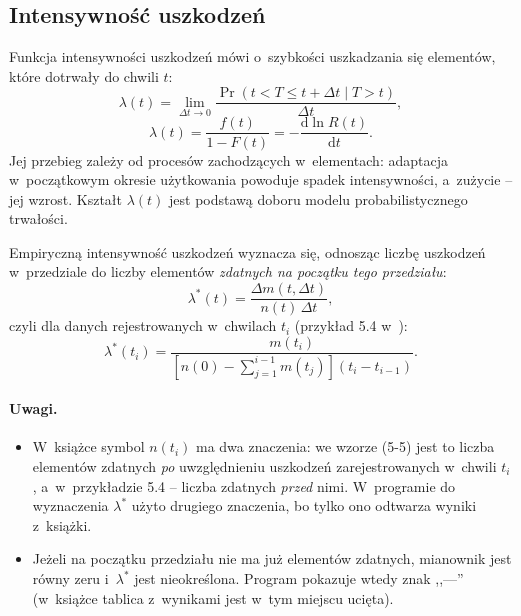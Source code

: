 \subsection{Intensywność uszkodzeń}

Funkcja intensywności uszkodzeń mówi o~szybkości uszkadzania się elementów, które
dotrwały do chwili $t$:
\begin{equation}
  \lambda(t) = \lim_{\Delta t \to 0} \frac{\Pr(t < T \leq t + \Delta t \mid T > t)}{\Delta t}, \tag{5-10}
\end{equation}
\begin{equation}
  \lambda(t) = \frac{f(t)}{1 - F(t)} = -\frac{\mathrm{d}\ln R(t)}{\mathrm{d}t}. \tag{5-11}
\end{equation}
Jej przebieg zależy od procesów zachodzących w~elementach: adaptacja w~początkowym
okresie użytkowania powoduje spadek intensywności, a~zużycie -- jej wzrost. Kształt
$\lambda(t)$ jest podstawą doboru modelu probabilistycznego trwałości.

Empiryczną intensywność uszkodzeń wyznacza się, odnosząc liczbę uszkodzeń
w~przedziale do liczby elementów \emph{zdatnych na początku tego przedziału}:
\begin{equation}
  \lambda^*(t) = \frac{\Delta m(t, \Delta t)}{n(t)\,\Delta t}, \tag{5-12}
\end{equation}
czyli dla danych rejestrowanych w~chwilach $t_i$ (przykład 5.4 w~\cite{prazewska}):
\begin{equation*}
  \lambda^*(t_i) = \frac{m(t_i)}{\left[n(0) - \sum_{j=1}^{i-1} m(t_j)\right](t_i - t_{i-1})}.
\end{equation*}

\paragraph{Uwagi.}
\begin{itemize}
  \item W~książce symbol $n(t_i)$ ma dwa znaczenia: we wzorze (5-5) jest to liczba
    elementów zdatnych \emph{po} uwzględnieniu uszkodzeń zarejestrowanych w~chwili
    $t_i$, a~w~przykładzie 5.4 -- liczba zdatnych \emph{przed} nimi. W~programie
    do wyznaczenia $\lambda^*$ użyto drugiego znaczenia, bo tylko ono odtwarza
    wyniki z~książki.
  \item Jeżeli na początku przedziału nie ma już elementów zdatnych, mianownik jest
    równy zeru i~$\lambda^*$ jest nieokreślona. Program pokazuje wtedy znak
    ,,---'' (w~książce tablica z~wynikami jest w~tym miejscu ucięta).
\end{itemize}

